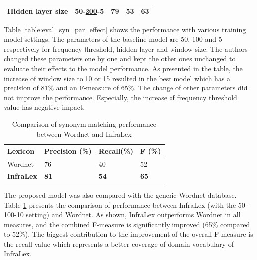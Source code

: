 \documentclass[Journal,InsideFigs, DoubleSpace]{ascelike} %
\begin{document}
{\begin{table} [b]
\begin{tabular}{l l l l l }
		\hline
		Hidden layer size	&50-\underline{200}-5	&79		&53		&63\\
		\hline
		\hline
	\end{tabular}
	\normalsize
\end{table}
%
Table \ref{table:eval_syn_par_effect} shows the performance with various training model settings. The parameters of the baseline model are 50, 100 and 5 respectively for frequency threshold, hidden layer and window size. The authors changed these parameters one by one and kept the other ones unchanged to evaluate their effects to the model performance. As presented in the table, the increase of window size to 10 or 15 resulted in the best model which has a precision of 81\% and an F-measure of 65\%. The change of other parameters did not improve the performance. Especially, the increase of frequency threshold value has negative impact. 
%
\begin{table} [b] 
	\caption{Comparison of synonym matching performance between Wordnet and InfraLex}
	\label{table:eval_syn_vs_Wordnet}
	\centering
	\small
	\renewcommand{\arraystretch}{1.25}
	\begin{tabular}{l l l l }
		\hline
		\hline
		\textbf{Lexicon} & \textbf{Precision (\%)}  & \textbf{Recall(\%)} & \textbf{F (\%)}\\
		\hline
		Wordnet	&76 	&40 	&52\\	
		\textbf{InfraLex} &\textbf{81}	&\textbf{54}		&\textbf{65}\\	
		\hline
		\hline
	\end{tabular}
	\normalsize
\end{table}
\par
The proposed model was also compared with the generic Wordnet database. Table \ref{table:eval_syn_vs_Wordnet} presents the comparison of performance between InfraLex (with the 50-100-10 setting) and Wordnet. As shown, InfraLex outperforms Wordnet in all measures, and the combined F-measure is significantly improved (65\% compared to 52\%). The biggest contribution to the improvement of the overall F-measure is the recall value which represents a better coverage of domain vocabulary of InfraLex. 

}
\end{document}
